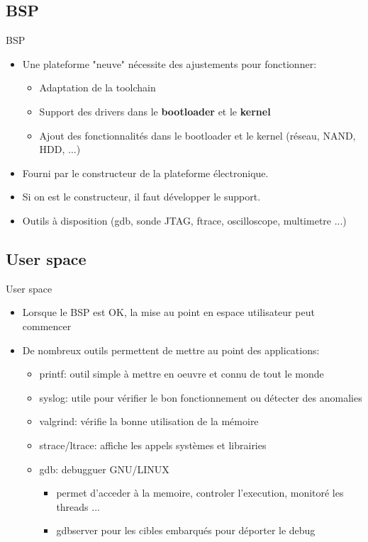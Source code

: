\subsection{BSP}
\begin{frame}{BSP}{}
  \begin{itemize}
  \item Une plateforme "neuve" nécessite des ajustements pour fonctionner:
    \begin{itemize}
    \item Adaptation de la toolchain
    \item Support des drivers dans le \textbf{bootloader} et le \textbf{kernel}
    \item Ajout des fonctionnalités dans le bootloader et le kernel (réseau, NAND, HDD, ...)
    \end{itemize}
  \item Fourni par le constructeur de la plateforme électronique.
  \item Si on est le constructeur, il faut développer le support.
  \item Outils à disposition (gdb, sonde JTAG, ftrace, oscilloscope, multimetre ...)
  \end{itemize}
\end{frame}

\subsection{User space}
\begin{frame}{User space}{}
  \begin{itemize}
  \item Lorsque le BSP est OK, la mise au point en espace utilisateur peut commencer
  \item De nombreux outils permettent de mettre au point des applications:
    \begin{itemize}
    \item printf: outil simple à mettre en oeuvre et connu de tout le monde
    \item syslog: utile pour vérifier le bon fonctionnement ou détecter des anomalies
    \item valgrind: vérifie la bonne utilisation de la mémoire
    \item strace/ltrace: affiche les appels systèmes et librairies
    \item gdb: debugguer GNU/LINUX
      \begin{itemize}
      \item permet d'acceder à la memoire, controler l'execution, monitoré les threads ...
      \item gdbserver pour les cibles embarqués pour déporter le debug
      \end{itemize}
    \end{itemize}
  \end{itemize}
\end{frame}
